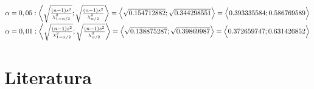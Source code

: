 \documentclass[11pt,a4paper]{article}
\begin{document}
$ \alpha = 0,05 : \biggl< \sqrt{\frac{(n - 1) s^2}{\chi_{1-\alpha/2}^2}} ; \sqrt{\frac{(n - 1) s^2}{\chi_{\alpha/2}^2}} \biggr> = \Bigl< \sqrt{0.154712882} ; \sqrt{0.344298551} \Bigr> = \Bigl< 0.393335584  ; 0.586769589 \Bigr> $ \\

$ \alpha = 0,01 : \biggl< \sqrt{\frac{(n - 1) s^2}{\chi_{1-\alpha/2}^2}} ; \sqrt{\frac{(n - 1) s^2}{\chi_{\alpha/2}^2}} \biggr> = \Bigl< \sqrt{0.138875287} ; \sqrt{0.39869987} \Bigr> = \Bigl< 0.372659747 ; 0.631426852 \Bigr> $ \\

\noindent\makebox[\linewidth]{\rule{\textwidth}{0.4pt}}


\newpage

\section{Literatura}

\begin{flushleft}
    
\end{flushleft}
\end{document}
